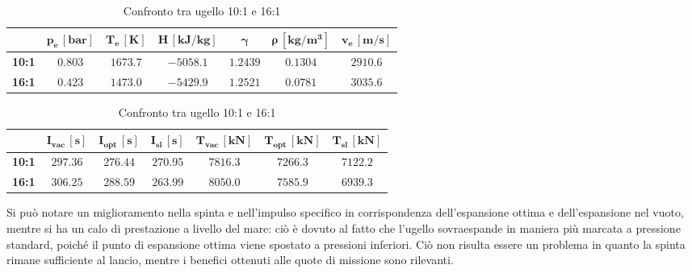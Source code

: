 \begin{table}[H]

\centering
\begin{tabular}{|c|c|c|c|c|c|c|}
\hline
& $\bm{p_e \, [bar]}$ & $\bm{T_e \, [K]}$ & $\bm{H \, [kJ/kg]}$ & $\bm{\gamma}$ & $\bm{\rho \, [kg/m^3]}$ & $\bm{v_e \, [m/s]}$ \\
\hline
\textbf{10:1} & $0.803$ & $1673.7$ & $-5058.1$ & $1.2439$ & $0.1304$ & $2910.6$ \\
\hline
\textbf{16:1} & $0.423$ & $1473.0$ & $-5429.9$ & $1.2521$ & $0.0781$ & $3035.6$ \\
\hline
\end{tabular}

\vspace{5pt}

\begin{tabular}{|c|c|c|c|c|c|c|}
\hline
& $\bm{I_{vac} \, [s]}$ & $\bm{I_{opt} \, [s]}$ & $\bm{I_{sl} \, [s]}$ & $\bm{T_{vac} \, [kN]}$ & $\bm{T_{opt} \, [kN]}$ & $\bm{T_{sl} \, [kN]}$ \\
\hline
\textbf{10:1} & $297.36$ & $276.44$ & $270.95$ & $7816.3$ & $7266.3$ & $7122.2$ \\
\hline
\textbf{16:1} & $306.25$ & $288.59$ & $263.99$ & $8050.0$ & $7585.9$ & $6939.3$ \\
\hline
\end{tabular}

\caption{Confronto tra ugello 10:1 e 16:1}
\label{table:confronto_ugello}

\end{table}

Si può notare un miglioramento nella spinta e nell'impulso specifico in corrispondenza dell'espansione ottima e dell'espansione nel vuoto, mentre si ha un calo di prestazione a livello del mare: ciò è dovuto al fatto che l'ugello sovraespande in maniera più marcata a pressione standard, poiché il punto di espansione ottima viene spostato a pressioni inferiori. Ciò non risulta essere un problema in quanto la spinta rimane sufficiente al lancio, mentre i benefici ottenuti alle quote di missione sono rilevanti.